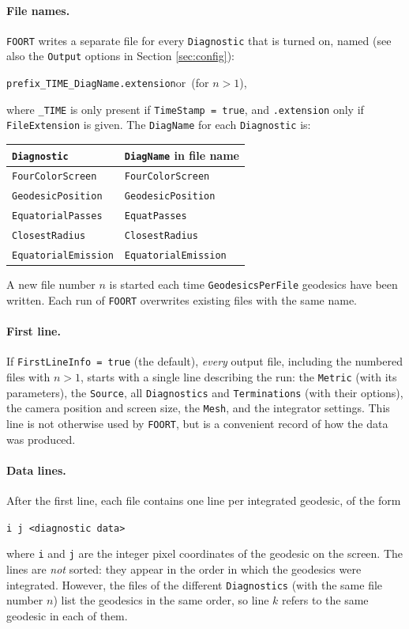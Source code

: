 \documentclass[11pt,a4paper]{article}
\newcommand{\code}[1]{{\tt #1}}
\begin{document}
\paragraph{File names.} \code{FOORT} writes a separate file for every \code{Diagnostic} that is turned on, named (see also the \code{Output} options in Section \ref{sec:config}):
\begin{center}
\code{prefix\_TIME\_DiagName.extension}\quad or\quad \code{prefix\_TIME\_DiagName\_n.extension}\ (for $n>1$),
\end{center}
where \code{\_TIME} is only present if \code{TimeStamp = true}, and \code{.extension} only if \code{FileExtension} is given. The \code{DiagName} for each \code{Diagnostic} is:
\begin{center}
\begin{tabular}{ll}
\code{Diagnostic} & \code{DiagName} in file name \\ \hline
\code{FourColorScreen} & \code{FourColorScreen} \\
\code{GeodesicPosition} & \code{GeodesicPosition} \\
\code{EquatorialPasses} & \code{EquatPasses} \\
\code{ClosestRadius} & \code{ClosestRadius} \\
\code{EquatorialEmission} & \code{EquatorialEmission}
\end{tabular}
\end{center}
A new file number $n$ is started each time \code{GeodesicsPerFile} geodesics have been written. Each run of \code{FOORT} overwrites existing files with the same name.

\paragraph{First line.} If \code{FirstLineInfo = true} (the default), \emph{every} output file, including the numbered files with $n>1$, starts with a single line describing the run: the \code{Metric} (with its parameters), the \code{Source}, all \code{Diagnostics} and \code{Terminations} (with their options), the camera position and screen size, the \code{Mesh}, and the integrator settings. This line is not otherwise used by \code{FOORT}, but is a convenient record of how the data was produced.

\paragraph{Data lines.} After the first line, each file contains one line per integrated geodesic, of the form
\begin{center}
\code{i j <diagnostic data>}
\end{center}
where \code{i} and \code{j} are the integer pixel coordinates of the geodesic on the screen. The lines are \emph{not} sorted: they appear in the order in which the geodesics were integrated. However, the files of the different \code{Diagnostics} (with the same file number $n$) list the geodesics in the same order, so line $k$ refers to the same geodesic in each of them.
\end{document}
